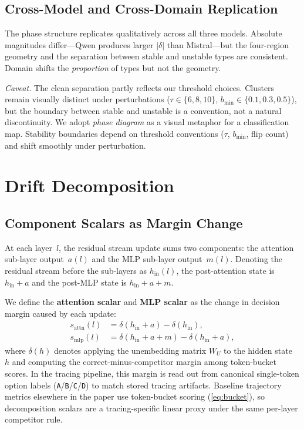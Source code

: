 \documentclass{article}
\begin{document}
\subsection{Cross-Model and Cross-Domain Replication}

The phase structure replicates qualitatively across all three models.  Absolute magnitudes differ---Qwen produces larger $|\delta|$ than Mistral---but the four-region geometry and the separation between stable and unstable types are consistent.  Domain shifts the \emph{proportion} of types but not the geometry.

\emph{Caveat.}  The clean separation partly reflects our threshold choices.  Clusters remain visually distinct under perturbations ($\tau \in \{6, 8, 10\}$, $b_{\min} \in \{0.1, 0.3, 0.5\}$), but the boundary between stable and unstable is a convention, not a natural discontinuity.  We adopt \emph{phase diagram} as a visual metaphor for a classification map.  Stability boundaries depend on threshold conventions ($\tau$, $b_{\min}$, flip count) and shift smoothly under perturbation.


\section{Drift Decomposition}
\label{sec:decomposition}

\subsection{Component Scalars as Margin Change}

At each layer~$l$, the residual stream update sums two components: the attention sub-layer output~$a(l)$ and the MLP sub-layer output~$m(l)$.  Denoting the residual stream before the sub-layers as $h_{\mathrm{in}}(l)$, the post-attention state is $h_{\mathrm{in}} + a$ and the post-MLP state is $h_{\mathrm{in}} + a + m$.

We define the \textbf{attention scalar} and \textbf{MLP scalar} as the change in decision margin caused by each update:
\begin{align}
  s_{\mathrm{attn}}(l) &= \delta(h_{\mathrm{in}} + a) - \delta(h_{\mathrm{in}}), \label{eq:s_attn} \\
  s_{\mathrm{mlp}}(l) &= \delta(h_{\mathrm{in}} + a + m) - \delta(h_{\mathrm{in}} + a), \label{eq:s_mlp}
\end{align}
where $\delta(h)$ denotes applying the unembedding matrix $W_U$ to the hidden state~$h$ and computing the correct-minus-competitor margin among token-bucket scores.
In the tracing pipeline, this margin is read out from canonical single-token option labels (\texttt{A}/\texttt{B}/\texttt{C}/\texttt{D}) to match stored tracing artifacts.
Baseline trajectory metrics elsewhere in the paper use token-bucket scoring (\cref{eq:bucket}), so decomposition scalars are a tracing-specific linear proxy under the same per-layer competitor rule.
\end{document}
